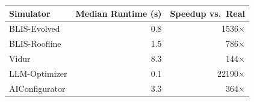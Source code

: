 \begin{tabular}{lrr}
\toprule
Simulator & Median Runtime (s) & Speedup vs.\ Real \\
\midrule
BLIS-Evolved & 0.8 & 1536$\times$ \\
BLIS-Roofline & 1.5 & 786$\times$ \\
Vidur & 8.3 & 144$\times$ \\
LLM-Optimizer & 0.1 & 22190$\times$ \\
AIConfigurator & 3.3 & 364$\times$ \\
\bottomrule
\end{tabular}